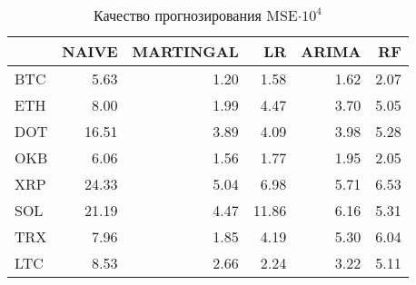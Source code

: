 \begin{table}[h]
\caption{Качество прогнозирования MSE$\cdot 10^4$}
\label{tab:ml_eval_metrics}
\begin{tabular}{lrrrrr}
\toprule
 & NAIVE & MARTINGAL & LR & ARIMA & RF \\
\midrule
BTC & 5.63 & 1.20 & 1.58 & 1.62 & 2.07 \\
ETH & 8.00 & 1.99 & 4.47 & 3.70 & 5.05 \\
DOT & 16.51 & 3.89 & 4.09 & 3.98 & 5.28 \\
OKB & 6.06 & 1.56 & 1.77 & 1.95 & 2.05 \\
XRP & 24.33 & 5.04 & 6.98 & 5.71 & 6.53 \\
SOL & 21.19 & 4.47 & 11.86 & 6.16 & 5.31 \\
TRX & 7.96 & 1.85 & 4.19 & 5.30 & 6.04 \\
LTC & 8.53 & 2.66 & 2.24 & 3.22 & 5.11 \\
\bottomrule
\end{tabular}
\end{table}
